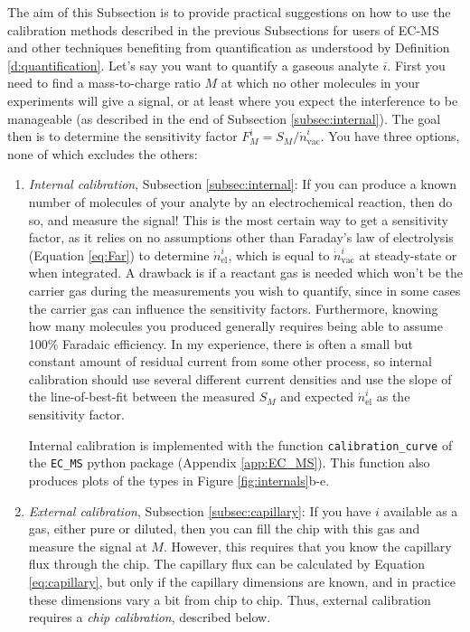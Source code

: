 The aim of this Subsection is to provide practical suggestions on how to use the calibration methods described in the previous Subsections for users of EC-MS and other techniques benefiting from quantification as understood by Definition \ref{d:quantification}. Let's say you want to quantify a gaseous analyte $i$. First you need to find a mass-to-charge ratio $M$ at which no other molecules in your experiments will give a signal, or at least where you expect the interference to be manageable (as described in the end of Subsection \ref{subsec:internal}). The goal then is to determine the sensitivity factor $F_M^i = S_M/\dot{n}^i_\text{vac}$. You have three options, none of which excludes the others:
\begin{enumerate}
\item \textit{Internal calibration}, Subsection \ref{subsec:internal}: If you can produce a known number of molecules of your analyte by an electrochemical reaction, then do so, and measure the signal! This is the most certain way to get a sensitivity factor, as it relies on no assumptions other than Faraday's law of electrolysis (Equation \ref{eq:Far}) to determine $\dot{n}^i_\text{el}$, which is equal to $\dot{n}^i_\text{vac}$ at steady-state or when integrated. A drawback is if a reactant gas is needed which won't be the carrier gas during the measurements you wish to quantify, since in some cases the carrier gas can influence the sensitivity factors. Furthermore, knowing how many molecules you produced generally requires being able to assume 100\% Faradaic efficiency. In my experience, there is often a small but constant amount of residual current from some other process, so internal calibration should use several different current densities and use the slope of the line-of-best-fit between the measured $S_M$ and expected $\dot{n}^i_\text{el}$ as the sensitivity factor. 

Internal calibration is implemented with the function \texttt{calibration\_curve} of the \texttt{EC\_MS} python package (Appendix \ref{app:EC_MS}). This function also produces plots of the types in Figure \ref{fig:internals}b-e.

\item 
\textit{External calibration}, Subsection \ref{subsec:capillary}: If you have $i$ available as a gas, either pure or diluted, then you can fill the chip with this gas and measure the signal at $M$. However, this requires that you know the capillary flux through the chip. The capillary flux can be calculated by Equation \ref{eq:capillary}, but only if the capillary dimensions are known, and in practice these dimensions vary a bit from chip to chip. Thus, external calibration requires a \textit{chip calibration}, described below. 


\end{enumerate}

